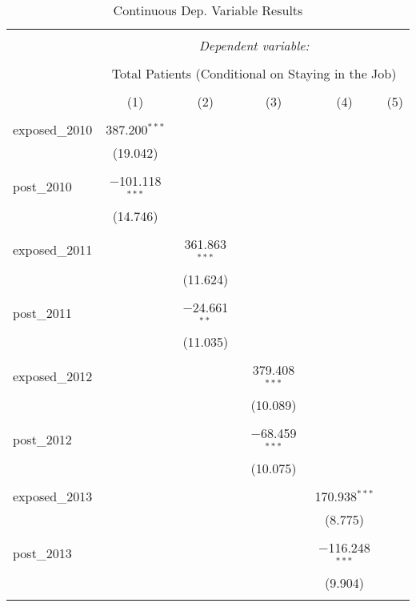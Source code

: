 
\begin{table}[!htbp] \centering 
  \caption{Continuous Dep. Variable Results} 
  \label{} 
\begin{tabular}{@{\extracolsep{5pt}}lccccc} 
\\[-1.8ex]\hline 
\hline \\[-1.8ex] 
 & \multicolumn{5}{c}{\textit{Dependent variable:}} \\ 
\cline{2-6} 
\\[-1.8ex] & \multicolumn{5}{c}{Total Patients (Conditional on Staying in the Job)} \\ 
\\[-1.8ex] & (1) & (2) & (3) & (4) & (5)\\ 
\hline \\[-1.8ex] 
 exposed\_2010 & 387.200$^{***}$ &  &  &  &  \\ 
  & (19.042) &  &  &  &  \\ 
  & & & & & \\ 
 post\_2010 & $-$101.118$^{***}$ &  &  &  &  \\ 
  & (14.746) &  &  &  &  \\ 
  & & & & & \\ 
 exposed\_2011 &  & 361.863$^{***}$ &  &  &  \\ 
  &  & (11.624) &  &  &  \\ 
  & & & & & \\ 
 post\_2011 &  & $-$24.661$^{**}$ &  &  &  \\ 
  &  & (11.035) &  &  &  \\ 
  & & & & & \\ 
 exposed\_2012 &  &  & 379.408$^{***}$ &  &  \\ 
  &  &  & (10.089) &  &  \\ 
  & & & & & \\ 
 post\_2012 &  &  & $-$68.459$^{***}$ &  &  \\ 
  &  &  & (10.075) &  &  \\ 
  & & & & & \\ 
 exposed\_2013 &  &  &  & 170.938$^{***}$ &  \\ 
  &  &  &  & (8.775) &  \\ 
  & & & & & \\ 
 post\_2013 &  &  &  & $-$116.248$^{***}$ &  \\ 
  &  &  &  & (9.904) &  \\ 
  & & & & & \\ 

\end{tabular}
\end{table}

